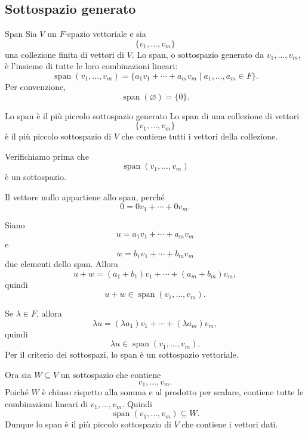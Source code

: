 \documentclass[a4paper]{article}
\begin{document}
\subsection{Sottospazio generato}

\begin{snippetdefinition}{Span}
    Sia \(V\) un \(F\)-spazio vettoriale e sia
    \[
        \{v_1,\ldots,v_m\}
    \]
    una collezione finita di vettori di \(V\). Lo span, o sottospazio generato da \(v_1,\ldots,v_m\), è l'insieme di tutte le loro combinazioni lineari:
    \[
        \operatorname{span}(v_1,\ldots,v_m)
        =
        \{a_1v_1+\cdots+a_mv_m\mid a_1,\ldots,a_m\in F\}.
    \]
    Per convenzione,
    \[
        \operatorname{span}(\varnothing)=\{0\}.
    \]
\end{snippetdefinition}

\begin{snippetproposition}{Lo span è il più piccolo sottospazio generato}
    Lo span di una collezione di vettori
    \[
        \{v_1,\ldots,v_m\}
    \]
    è il più piccolo sottospazio di \(V\) che contiene tutti i vettori della collezione.
\end{snippetproposition}

\begin{snippetproof}{}
    Verifichiamo prima che
    \[
        \operatorname{span}(v_1,\ldots,v_m)
    \]
    è un sottospazio.

    Il vettore nullo appartiene allo span, perché
    \[
        0=0v_1+\cdots+0v_m.
    \]

    Siano
    \[
        u=a_1v_1+\cdots+a_mv_m
    \]
    e
    \[
        w=b_1v_1+\cdots+b_mv_m
    \]
    due elementi dello span. Allora
    \[
        u+w
        =
        (a_1+b_1)v_1+\cdots+(a_m+b_m)v_m,
    \]
    quindi
    \[
        u+w\in \operatorname{span}(v_1,\ldots,v_m).
    \]

    Se \(\lambda\in F\), allora
    \[
        \lambda u
        =
        (\lambda a_1)v_1+\cdots+(\lambda a_m)v_m,
    \]
    quindi
    \[
        \lambda u\in \operatorname{span}(v_1,\ldots,v_m).
    \]
    Per il criterio dei sottospazi, lo span è un sottospazio vettoriale.

    Ora sia \(W\subseteq V\) un sottospazio che contiene
    \[
        v_1,\ldots,v_m.
    \]
    Poiché \(W\) è chiuso rispetto alla somma e al prodotto per scalare, contiene tutte le combinazioni lineari di \(v_1,\ldots,v_m\). Quindi
    \[
        \operatorname{span}(v_1,\ldots,v_m)\subseteq W.
    \]
    Dunque lo span è il più piccolo sottospazio di \(V\) che contiene i vettori dati.
\end{snippetproof}
\end{document}
